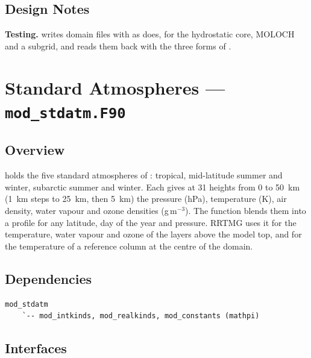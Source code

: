 \subsection{Design Notes}

\textbf{Testing.}  writes domain files
with  as  does, for the hydrostatic core,
MOLOCH and a subgrid, and reads them back with the three forms of
.

\section{Standard Atmospheres --- \texttt{mod\_stdatm.F90}}
\label{sec:stdatm}

\subsection{Overview}

 holds the five standard atmospheres of
\citet{mcclatchey1972}: tropical, mid-latitude summer and winter, subarctic
summer and winter. Each gives at 31 heights from 0 to 50~km (1~km steps to
25~km, then 5~km) the pressure (hPa), temperature (K), air density, water
vapour and ozone densities (g\,m$^{-3}$). The function 
blends them into a profile for any latitude, day of the year and pressure.
RRTMG uses it for the temperature, water vapour and ozone of the layers
above the model top, and  for the temperature of a reference
column at the centre of the domain.

\subsection{Dependencies}

\begin{lstlisting}
mod_stdatm
    `-- mod_intkinds, mod_realkinds, mod_constants (mathpi)
\end{lstlisting}

\subsection{Interfaces}

